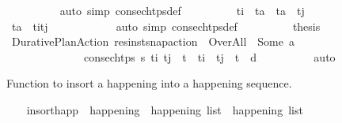 \begin{isabellebody}
\ \ \ \ \ \ \ \ \isamarkupfalse%
\ {\isacharparenleft}{\kern0pt}auto\ simp{\isacharcolon}{\kern0pt}\ consec{\isacharunderscore}{\kern0pt}htps{\isacharunderscore}{\kern0pt}def{\isacharparenright}{\kern0pt}\isanewline
\ \ \ \ \ \ \isamarkupfalse%
\ \isamarkupfalse%
\ {\isachardoublequoteopen}t\isactrlsub i\ {\isacharless}{\kern0pt}\ t\isactrlsub a\ {\isasymand}\ t\isactrlsub a\ {\isacharless}{\kern0pt}\ t\isactrlsub j{\isachardoublequoteclose}\isanewline
\ \ \ \ \ \ \ \ \isamarkupfalse%
\ {\isacartoucheopen}t\isactrlsub a\ {\isacharequal}{\kern0pt}\ {\isacharparenleft}{\kern0pt}t\isactrlsub i{\isacharplus}{\kern0pt}t\isactrlsub j{\isacharparenright}{\kern0pt}\ {\isacharslash}{\kern0pt}\ {}{\isacartoucheclose}\isanewline
\ \ \ \ \ \ \ \ \isamarkupfalse%
\ {\isacharparenleft}{\kern0pt}auto\ simp{\isacharcolon}{\kern0pt}\ consec{\isacharunderscore}{\kern0pt}htps{\isacharunderscore}{\kern0pt}def{\isacharparenright}{\kern0pt}\isanewline
\ \ \ \ \ \ \isamarkupfalse%
\ \isamarkupfalse%
\ {\isacharquery}{\kern0pt}thesis\isanewline
\ \ \ \ \ \ \ \ \isamarkupfalse%
\ Durative{\isacharunderscore}{\kern0pt}Plan{\isacharunderscore}{\kern0pt}Action\ {\isacartoucheopen}res{\isacharunderscore}{\kern0pt}inst{\isacharunderscore}{\kern0pt}snap{\isacharunderscore}{\kern0pt}action\ {\isasympi}\ Over{\isacharunderscore}{\kern0pt}All\ {\isacharequal}{\kern0pt}\ Some\ a{\isacartoucheclose}\ \isanewline
\ \ \ \ \ \ \ \ \ \ \ \ \ \ {\isacartoucheopen}consec{\isacharunderscore}{\kern0pt}htps\ {\isasympi}s\ t\isactrlsub i\ t\isactrlsub j\ {\isasymand}\ t\isactrlsub {\isasympi}\ {\isasymle}\ t\isactrlsub i\ {\isasymand}\ t\isactrlsub j\ {\isasymle}\ t\isactrlsub {\isasympi}\ {\isacharplus}{\kern0pt}\ d{\isacartoucheclose}\isanewline
\ \ \ \ \ \ \ \ \isamarkupfalse%
\ auto\isanewline
\ \ \ \ \isamarkupfalse%
\isanewline
\ \ \isamarkupfalse%
%
\endisatagproof
{\isafoldproof}%
%
\isadelimproof
%
\endisadelimproof
%
\begin{isamarkuptext}%
Function to insort a happening into a happening sequence.%
\end{isamarkuptext}\isamarkuptrue%
\ \ \isamarkupfalse%
\ insort{\isacharunderscore}{\kern0pt}happ\ {\isacharcolon}{\kern0pt}{\isacharcolon}{\kern0pt}\ {\isachardoublequoteopen}happening\ {\isasymRightarrow}\ happening\ list\ {\isasymRightarrow}\ happening\ list{\isachardoublequoteclose}\ \isanewline

\end{isabellebody}
